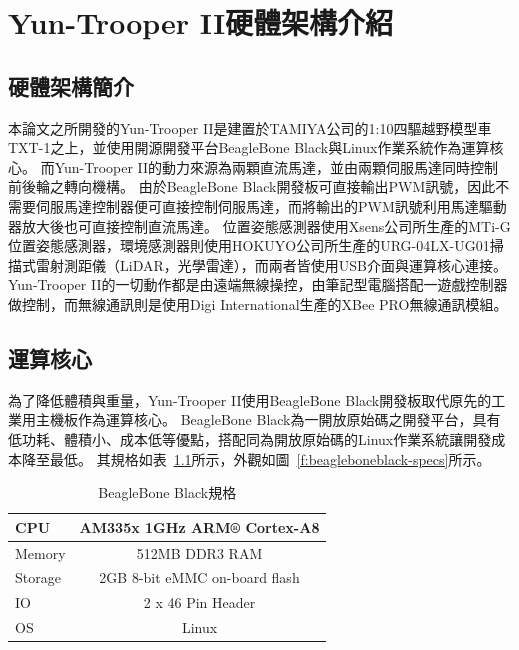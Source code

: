 \chapter{Yun-Trooper II硬體架構介紹}
\label{c:hardware}

\section{硬體架構簡介}
本論文之所開發的Yun-Trooper II是建置於TAMIYA公司的1:10四驅越野模型車TXT-1之上，並使用開源開發平台BeagleBone Black與Linux作業系統作為運算核心。
而Yun-Trooper II的動力來源為兩顆直流馬達，並由兩顆伺服馬達同時控制前後輪之轉向機構。
由於BeagleBone Black開發板可直接輸出PWM訊號，因此不需要伺服馬達控制器便可直接控制伺服馬達，而將輸出的PWM訊號利用馬達驅動器放大後也可直接控制直流馬達。
位置姿態感測器使用Xsens公司所生產的MTi-G位置姿態感測器，環境感測器則使用HOKUYO公司所生產的URG-04LX-UG01掃描式雷射測距儀（LiDAR，光學雷達），而兩者皆使用USB介面與運算核心連接。
Yun-Trooper II的一切動作都是由遠端無線操控，由筆記型電腦搭配一遊戲控制器做控制，而無線通訊則是使用Digi International生產的XBee PRO無線通訊模組。

\section{運算核心}
為了降低體積與重量，Yun-Trooper II使用BeagleBone Black開發板取代原先的工業用主機板作為運算核心。
BeagleBone Black為一開放原始碼之開發平台，具有低功耗、體積小、成本低等優點，搭配同為開放原始碼的Linux作業系統讓開發成本降至最低。
其規格如表~\ref{t:beagleboneblack-specs}所示，外觀如圖~\ref{f:beagleboneblack-specs}所示。

\begin{table}[h!]
	\centering
	\caption{BeagleBone Black規格}
	\label{t:beagleboneblack-specs}
	\begin{tabular}{ | l | c |}
		\hline
		CPU & AM335x 1GHz ARM® Cortex-A8 \\ \hline
		Memory & 512MB DDR3 RAM \\ \hline
		Storage & 2GB 8-bit eMMC on-board flash \\ \hline
		IO & 2 x 46 Pin Header \\ \hline 
		OS & Linux \\
		\hline
	\end{tabular}
\end{table}

